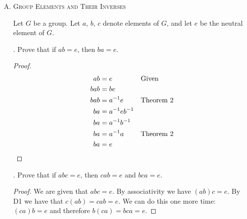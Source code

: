 \documentclass[twoside]{amsart}
\begin{document}
\begin{enumerate}[A.]
   . $xax^{-1}$ commutes with $xbx^{-1}$, for any $x\in G$.
   \begin{proof}
   \begin{align*}
      xax^{-1}xbx^{-1} & = xabx^{-1} \\
                       & = xbax^{-1} && \text{Commutativity} \\
		       & = x(be)ax^{-1} && \text{Identity} \\
		       & = x(b(x^{-1}x)ax^{-1} && \text{Inverses}\\
		       & = xbx^{-1}xax^{-1} && \text{Associativity}\qedhere
   \end{align*}
   \end{proof}

   . $ab=ba$ iff $aba^{-1}=b$.
   \begin{proof}
   First we will assume $ab=ba$. Given this we can derive
   $abe=aba^{-1}a=ba$ and this can be reduced to $aba^{-1}=b$.
   It is trivial to reverse: $aba^{-1}=b$, therefore $aba^{-1}a=ba$,
   therefore $ab=ba$.
   \end{proof}
   
   . $ab=ba$ iff $aba^{-1}b^{-1}=e$.
   \begin{proof}
   Assume $ab=ba$. Then we know (by 6) that $aba^{-1}=b$. Therefore,
   $aba^{-1}b^{-1}=e$. The reverse direction is trivial.
   \end{proof}

   \item \textsc{Group Elements and Their Inverses}

   \noindent Let $G$ be a group. Let $a$, $b$, $c$ denote elements of
   $G$, and let $e$ be the neutral element of $G$.

   . Prove that if $ab=e$, then $ba=e$.
   \begin{proof}
      \begin{align*}
         ab & = e && \text{Given} \\
	 bab & = be && \\
	 bab & = a^{-1}e && \text{Theorem 2}\\
	 ba  & = a^{-1}eb^{-1} \\
	 ba  & = a^{-1}b^{-1} \\
	 ba  & = a^{-1}a && \text{Theorem 2} \\
	 ba  & = e \qedhere
      \end{align*}
   \end{proof}

   . Prove that if $abc=e$, then $cab=e$ and $bca=e$.
   \begin{proof}
   We are given that $abc=e$. By associativity we have $(ab)c=e$.
   By D1 we have that $c(ab)=cab=e$. We can do this one more time:
   $(ca)b=e$ and therefore $b(ca)=bca=e$.
   \end{proof}


\end{enumerate}
\end{document}
